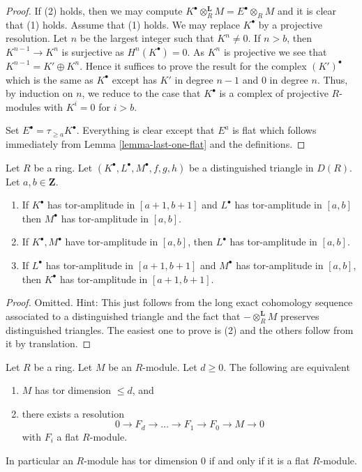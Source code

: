 \begin{proof}
If (2) holds, then we may compute
$K^\bullet \otimes_R^\mathbf{L} M = E^\bullet \otimes_R M$
and it is clear that (1) holds.
Assume that (1) holds. We may replace $K^\bullet$ by
a projective resolution.
Let $n$ be the largest integer such that $K^n \not = 0$.
If $n > b$, then $K^{n - 1} \to K^n$ is surjective as
$H^n(K^\bullet) = 0$. As $K^n$ is projective we see that
$K^{n - 1} = K' \oplus K^n$. Hence it suffices to prove the result
for the complex $(K')^\bullet$ which is the same as $K^\bullet$
except has $K'$ in degree $n - 1$ and $0$ in degree $n$.
Thus, by induction on $n$, we reduce to the case that $K^\bullet$
is a complex of projective $R$-modules with $K^i = 0$ for $i > b$.

\medskip\noindent
Set $E^\bullet = \tau_{\geq a}K^\bullet$. Everything is clear except
that $E^a$ is flat which follows immediately from
Lemma \ref{lemma-last-one-flat}
and the definitions.
\end{proof}

\begin{lemma}
\label{lemma-cone-tor-amplitude}
Let $R$ be a ring.
Let $(K^\bullet, L^\bullet, M^\bullet, f, g, h)$ be a distinguished
triangle in $D(R)$. Let $a, b \in \mathbf{Z}$.
\begin{enumerate}
\item If $K^\bullet$ has tor-amplitude in $[a + 1, b + 1]$ and
$L^\bullet$ has tor-amplitude in $[a, b]$ then $M^\bullet$ has
tor-amplitude in $[a, b]$.
\item If $K^\bullet, M^\bullet$ have tor-amplitude in $[a, b]$, then
$L^\bullet$ has tor-amplitude in $[a, b]$.
\item If $L^\bullet$ has tor-amplitude in $[a + 1, b + 1]$
and $M^\bullet$ has tor-amplitude in $[a, b]$, then
$K^\bullet$ has tor-amplitude in $[a + 1, b + 1]$.
\end{enumerate}
\end{lemma}

\begin{proof}
Omitted. Hint: This just follows from the long exact cohomology sequence
associated to a distinguished triangle and the fact that
$- \otimes_R^{\mathbf{L}} M$ preserves distinguished triangles.
The easiest one to prove is (2) and the others follow from it by
translation.
\end{proof}

\begin{lemma}
\label{lemma-tor-dimension}
Let $R$ be a ring. Let $M$ be an $R$-module.
Let $d \geq 0$. The following are equivalent
\begin{enumerate}
\item $M$ has tor dimension $\leq d$, and
\item there exists a resolution
$$
0 \to F_d \to \ldots \to F_1 \to F_0 \to M \to 0
$$
with $F_i$ a flat $R$-module.
\end{enumerate}
In particular an $R$-module has tor dimension $0$ if and only if
it is a flat $R$-module.
\end{lemma}

